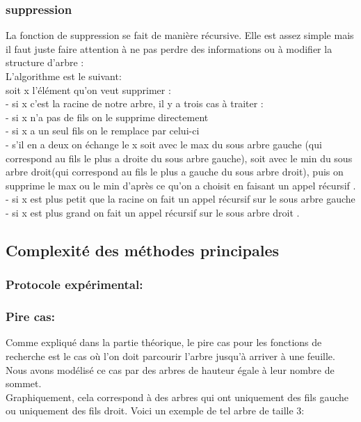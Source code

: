 \documentclass{report}
\begin{document}
\subsubsection{suppression}
La fonction de suppression se fait de manière récursive. Elle est assez simple mais il faut juste faire attention à ne pas perdre des informations ou à modifier la structure d'arbre :
\\L'algorithme est le suivant:
\\soit x l'élément qu'on veut supprimer :
\\- si x c'est la racine de notre arbre, il y a trois cas à traiter :
\\	- si x n'a pas de fils on le supprime directement
\\	- si x a un seul fils on le remplace par celui-ci
\\  - s'il en a deux on échange le x soit avec le max du sous arbre gauche (qui correspond au fils le plus a droite du sous arbre gauche), soit avec le min du sous arbre droit(qui correspond au fils le plus 
a gauche du sous arbre droit), puis on supprime le max ou le min d'après ce qu'on a choisit en faisant un appel récursif .
\\- si x est plus petit que la racine on fait un appel récursif sur le sous arbre gauche 
\\- si x est plus grand on fait un appel récursif sur le sous arbre droit .

\subsection{Complexité des méthodes principales}
\subsubsection{Protocole expérimental:}
\subsubsection{Pire cas:}
Comme expliqué dans la partie théorique, le pire cas pour les fonctions de recherche est le cas où l'on doit parcourir l'arbre jusqu'à arriver à une feuille.
Nous avons modélisé ce cas par des arbres de hauteur égale à leur nombre de sommet. \\
Graphiquement, cela correspond à des arbres qui ont uniquement des fils gauche ou uniquement des fils droit. Voici un exemple de tel arbre de taille 3:

\begin{center}
\end{center}
\end{document}

